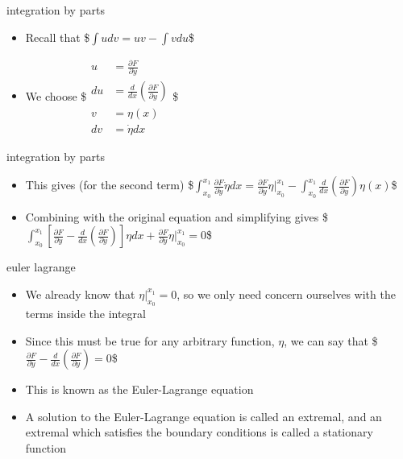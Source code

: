 \documentclass[12pt,handout]{beamer}
\providecommand{\tightlist}{%
  \setlength{\itemsep}{0pt}\setlength{\parskip}{0pt}}
\providecommand{\tightlist}{%
\setlength{\itemsep}{0pt}\setlength{\parskip}{0pt}}
\begin{document}
\begin{frame}{integration by parts}
\protect\hypertarget{integration-by-parts}{}
\begin{itemize}
\item
  Recall that \$\(\int u dv = uv - \int v du\)\$
\item
  We choose
  \$\(\begin{aligned}  u &= \frac{\partial F}{\partial \dot{y}}\\  du &= \frac{d}{dx} \left( \frac{\partial F}{\partial y} \right)\\  v &= \eta(x)\\  dv &= \dot{\eta} dx \end{aligned}\)\$
\end{itemize}
\end{frame}

\begin{frame}{integration by parts}
\protect\hypertarget{integration-by-parts-1}{}
\begin{itemize}
\tightlist
\item
  This gives (for the second term)
  \$\(\int_{x_0}^{x_1} \frac{\partial F}{\partial \dot{y}}\dot{\eta} dx = \frac{\partial F}{\partial \dot{y}}\eta |_{x_0}^{x_1} - \int_{x_0}^{x_1} \frac{d}{dx} \left( \frac{\partial F}{\partial y} \right) \eta(x)\)\$
\item
  Combining with the original equation and simplifying gives
  \$\(\int_{x_0}^{x_1} \left [ \frac{\partial F}{\partial y} - \frac{d}{dx} \left( \frac{\partial F}{\partial y} \right) \right ]\eta dx + \frac{\partial F}{\partial \dot{y}}\eta |_{x_0}^{x_1} = 0\)\$
\end{itemize}
\end{frame}

\begin{frame}{euler lagrange}
\protect\hypertarget{euler-lagrange-6}{}
\begin{itemize}
\tightlist
\item
  We already know that \(\eta|_{x_0}^{x_1}=0\), so we only need concern
  ourselves with the terms inside the integral
\item
  Since this must be true for any arbitrary function, \(\eta\), we can
  say that
  \$\(\frac{\partial F}{\partial y} - \frac{d}{dx} \left( \frac{\partial F}{\partial y} \right) = 0\)\$
\item
  This is known as the Euler-Lagrange equation
\item
  A solution to the Euler-Lagrange equation is called an extremal, and
  an extremal which satisfies the boundary conditions is called a
  stationary function
\end{itemize}
\end{frame}
\end{document}
